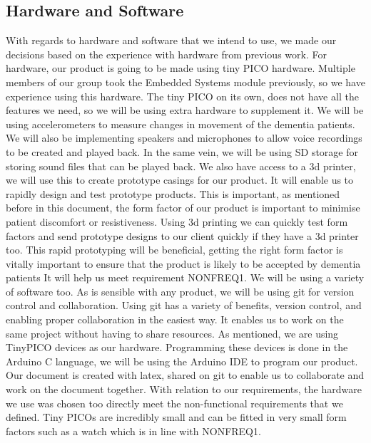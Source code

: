        \subsection{Hardware and Software}
            With regards to hardware and software that we intend to use, we made our decisions based on the experience with
            hardware from previous work. For hardware, our product is going to be made using tiny PICO hardware. Multiple
            members of our group took the Embedded Systems module previously, so we have experience using this hardware. The
            tiny PICO on its own, does not have all the features we need, so we will be using extra hardware to supplement it.
            We will be using accelerometers to measure changes in movement of the dementia patients. We will also be
            implementing speakers and microphones to allow voice recordings to be created and played back. In the same vein, we
            will be using SD storage for storing sound files that can be played back. We also have access to a 3d printer, we
            will use this to create prototype casings for our product. It will enable us to rapidly design and test prototype
            products. This is important, as mentioned before in this document, the form factor of our product is important to
            minimise patient discomfort or resistiveness. Using 3d printing we can quickly test form factors and send prototype
            designs to our client quickly if they have a 3d printer too. This rapid prototyping will be beneficial, getting the
            right form factor is vitally important to ensure that the product is likely to be accepted by dementia patients It
            will help us meet requirement NONFREQ1. We will be using a variety of software too. As is sensible with any product,
            we will be using git for version control and collaboration. Using git has a variety of benefits, version control,
            and enabling proper collaboration in the easiest way. It enables us to work on the same project without having to
            share resources. As mentioned, we are using TinyPICO devices as our hardware. Programming these devices is done in
            the Arduino C language, we will be using the Arduino IDE to program our product. Our document is created with latex,
            shared on git to enable us to collaborate and work on the document together. With relation to our requirements, the
            hardware we use was chosen too directly meet the non-functional requirements that we defined. Tiny PICOs are
            incredibly small and can be fitted in very small form factors such as a watch which is in line with NONFREQ1.
